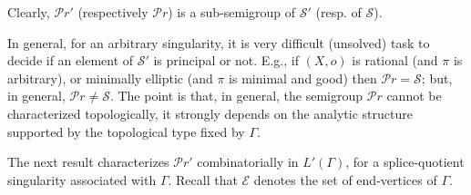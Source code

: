\documentclass[10pt,a4paper]{amsart}
\numberwithin{equation}{section}
\numberwithin{equation}{subsection}
\theoremstyle{plain}
\theoremstyle{definition}
\begin{document}
Clearly,  ${\mathcal Pr}'$ (respectively ${\mathcal Pr}$) is a sub-semigroup of
${\mathcal{S}}'$ (resp. of ${\mathcal{S}}$).

In general, for an arbitrary singularity, it is very difficult
(unsolved) task to decide if an element of ${\mathcal{S}}'$ is principal or
not. E.g., if $(X,o)$ is rational (and $\pi$ is arbitrary), or
minimally elliptic (and $\pi$ is minimal and good) then
${\mathcal Pr}={\mathcal{S}}$; but, in general, ${\mathcal Pr}\not={\mathcal{S}}$. The point is that, in
general, the semigroup ${\mathcal Pr}$ cannot be characterized
topologically, it strongly depends on the analytic structure
supported by the topological type fixed by $\Gamma$.

The next result characterizes ${\mathcal Pr}'$ combinatorially in
$L'(\Gamma)$, for a splice-quotient singularity associated with
$\Gamma$. Recall that ${\mathcal{E}}$ denotes the set of end-vertices of
$\Gamma$.
\end{document}
